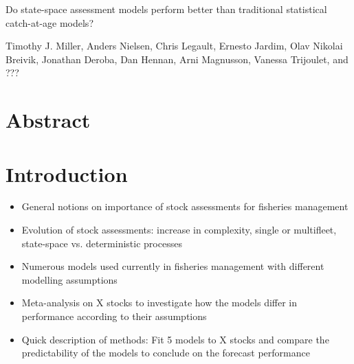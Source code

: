 \documentclass[12pt,letterpaper, leqno]{article}
\begin{document}


\pagestyle{plain}

\begin{titlepage}\center \large

\vspace{144pt}

Do state-space assessment models perform better than traditional statistical catch-at-age models?

\vspace{144pt}

Timothy J. Miller, Anders Nielsen, Chris Legault, Ernesto Jardim, Olav Nikolai Breivik, Jonathan Deroba, Dan Hennan, Arni Magnusson, Vanessa Trijoulet, %
and ???
\end{titlepage}

\setcounter{page}{2}

\cfoot{\thepage}

\setcounter{page}{2}
\def\fourteenbold{\fontseries{b}\fontsize{14pt}{12pt}\selectfont}
\def\twelvebold{\fontseries{b}\fontsize{12pt}{12pt}\selectfont}
\def\twelveit{\fontshape{it}\fontseries{m}\fontsize{12pt}{12pt}\selectfont}
\sectionfont{\fourteenbold}
\subsectionfont{\twelvebold}
\subsectionfont{\twelvebold}
\subsubsectionfont{\twelveit}

\setcounter{footnote}{0}


\section*{Abstract}


\pagebreak

\section*{Introduction}

\begin{itemize}
\item General notions on importance of stock assessments for fisheries management
\item Evolution of stock assessments: increase in complexity, single or multifleet, state-space vs. deterministic processes
\item Numerous models used currently in fisheries management with different modelling assumptions
\item Meta-analysis on X stocks to investigate how the models differ in performance according to their assumptions
\item Quick description of methods: Fit 5 models to X stocks and compare the predictability of the models to conclude on the forecast performance
\end{itemize}
\end{document}
